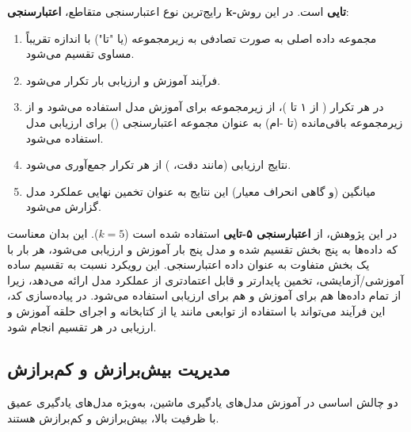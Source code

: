 رایج‌ترین نوع اعتبارسنجی متقاطع، \textbf{اعتبارسنجی {k-تایی} } است. در این روش:
\begin{enumerate}
    \item مجموعه داده اصلی به صورت تصادفی به  زیرمجموعه (یا "تا") با اندازه تقریباً مساوی تقسیم می‌شود.
    \item فرآیند آموزش و ارزیابی  بار تکرار می‌شود.
    \item در هر تکرار ( از ۱ تا )، از  زیرمجموعه برای آموزش مدل استفاده می‌شود و از زیرمجموعه باقی‌مانده (تا -ام) به عنوان مجموعه اعتبارسنجی () برای ارزیابی مدل استفاده می‌شود.
    \item نتایج ارزیابی (مانند دقت، ) از هر  تکرار جمع‌آوری می‌شود.
    \item میانگین (و گاهی انحراف معیار) این نتایج به عنوان تخمین نهایی عملکرد مدل گزارش می‌شود.
\end{enumerate}
در این پژوهش، از \textbf{اعتبارسنجی ۵-تایی } استفاده شده است (\(k=5\)). این بدان معناست که داده‌ها به پنج بخش تقسیم شده و مدل پنج بار آموزش و ارزیابی می‌شود، هر بار با یک بخش متفاوت به عنوان داده اعتبارسنجی. این رویکرد نسبت به تقسیم ساده آموزشی/آزمایشی، تخمین پایدارتر و قابل اعتمادتری از عملکرد مدل ارائه می‌دهد، زیرا از تمام داده‌ها هم برای آموزش و هم برای ارزیابی استفاده می‌شود. در پیاده‌سازی کد، این فرآیند می‌تواند با استفاده از توابعی مانند  یا  از کتابخانه  و اجرای حلقه آموزش و ارزیابی در هر تقسیم انجام شود.

\subsection{مدیریت بیش‌برازش و کم‌برازش}
دو چالش اساسی در آموزش مدل‌های یادگیری ماشین، به‌ویژه مدل‌های یادگیری عمیق با ظرفیت بالا، بیش‌برازش  و کم‌برازش  هستند.

